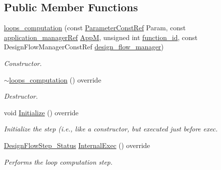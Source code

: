 \subsection*{Public Member Functions}
\begin{DoxyCompactItemize}
\item 
\hyperlink{classloops__computation_ac4731d0cc3146dd896f9b38a73e37bde}{loops\+\_\+computation} (const \hyperlink{Parameter_8hpp_a37841774a6fcb479b597fdf8955eb4ea}{Parameter\+Const\+Ref} Param, const \hyperlink{application__manager_8hpp_a04ccad4e5ee401e8934306672082c180}{application\+\_\+manager\+Ref} \hyperlink{classFrontendFlowStep_a0ac0d8db2a378416583f51c4faa59d15}{AppM}, unsigned int \hyperlink{classFunctionFrontendFlowStep_a58ef2383ad1a212a8d3f396625a4b616}{function\+\_\+id}, const Design\+Flow\+Manager\+Const\+Ref \hyperlink{classDesignFlowStep_ab770677ddf087613add30024e16a5554}{design\+\_\+flow\+\_\+manager})
\begin{DoxyCompactList}\small\item\em Constructor. \end{DoxyCompactList}\item 
\hyperlink{classloops__computation_a98efcffcabc94e5f8d03fceeb6b6bf92}{$\sim$loops\+\_\+computation} () override
\begin{DoxyCompactList}\small\item\em Destructor. \end{DoxyCompactList}\item 
void \hyperlink{classloops__computation_a9faf9a8d51f9f0ab9015e44bc912d4e4}{Initialize} () override
\begin{DoxyCompactList}\small\item\em Initialize the step (i.\+e., like a constructor, but executed just before exec. \end{DoxyCompactList}\item 
\hyperlink{design__flow__step_8hpp_afb1f0d73069c26076b8d31dbc8ebecdf}{Design\+Flow\+Step\+\_\+\+Status} \hyperlink{classloops__computation_ad50436ee7a9e468bec203289151bd096}{Internal\+Exec} () override
\begin{DoxyCompactList}\small\item\em Performs the loop computation step. \end{DoxyCompactList}\end{DoxyCompactItemize}
